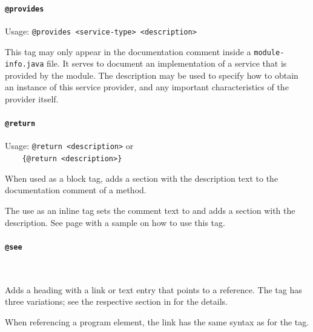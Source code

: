
\paragraph{\lstinline|@provides|}\label{sec:TagProvides}  Usage: \lstinline|@provides <service-type> <description>|

This tag may only appear in the documentation comment inside a \texttt{module-info.java} file. It serves to document an implementation of a service that is provided by the module. The description may be used to specify how to obtain an instance of this service provider, and any important characteristics of the provider itself. 


\paragraph{\lstinline|@return|}\label{sec:TagReturn}  Usage: \lstinline|@return <description>| or\\
\lstinline|    {@return <description>}|

When used as a block tag,  adds a  section with the description text to the documentation comment of a method.

The use as an inline tag  sets the comment text to  and adds a  section with the description. See page \pageref{sec:ReturnValue} with a sample on how to use this tag. 


\paragraph{\lstinline|@see|}\label{sec:TagSee} \  

Adds a  heading with a link or text entry that points to a reference. The tag has three variations; see the respective section in \autocite{ORACLE_DOC_JAVADOC_TAG} for the details.

When referencing a program element, the link has the same syntax as for the  tag.

